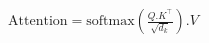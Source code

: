 \documentclass[preview]{standalone}
\begin{document}
\begin{align*}
\text{Attention} = \text{softmax}\left( \frac{Q.K^\top}{\sqrt{d_k}} \right).V
\end{align*}
\end{document}
